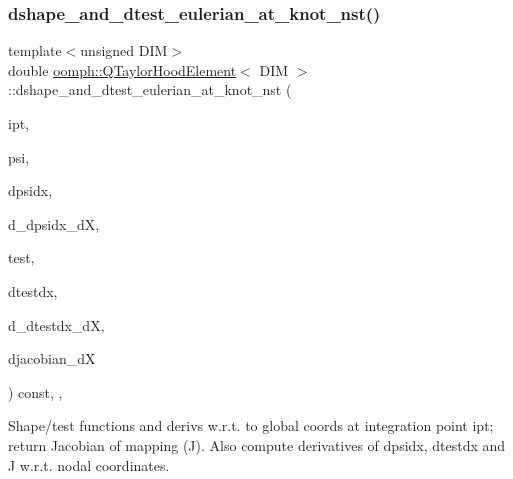 \mbox{\label{classoomph_1_1QTaylorHoodElement_ae37df57d30a5fdd716667e07ecd1796b}} 
\subsubsection{\texorpdfstring{dshape\+\_\+and\+\_\+dtest\+\_\+eulerian\+\_\+at\+\_\+knot\+\_\+nst()}{dshape\_and\_dtest\_eulerian\_at\_knot\_nst()}\hspace{0.1cm}{\footnotesize\ttfamily [2/4]}}
{\footnotesize\ttfamily template$<$unsigned D\+IM$>$ \\
double \hyperlink{classoomph_1_1QTaylorHoodElement}{oomph\+::\+Q\+Taylor\+Hood\+Element}$<$ D\+IM $>$\+::dshape\+\_\+and\+\_\+dtest\+\_\+eulerian\+\_\+at\+\_\+knot\+\_\+nst (\begin{DoxyParamCaption}\item[{const unsigned \&}]{ipt,  }\item[{\hyperlink{classoomph_1_1Shape}{Shape} \&}]{psi,  }\item[{\hyperlink{classoomph_1_1DShape}{D\+Shape} \&}]{dpsidx,  }\item[{\hyperlink{classoomph_1_1RankFourTensor}{Rank\+Four\+Tensor}$<$ double $>$ \&}]{d\+\_\+dpsidx\+\_\+dX,  }\item[{\hyperlink{classoomph_1_1Shape}{Shape} \&}]{test,  }\item[{\hyperlink{classoomph_1_1DShape}{D\+Shape} \&}]{dtestdx,  }\item[{\hyperlink{classoomph_1_1RankFourTensor}{Rank\+Four\+Tensor}$<$ double $>$ \&}]{d\+\_\+dtestdx\+\_\+dX,  }\item[{\hyperlink{classoomph_1_1DenseMatrix}{Dense\+Matrix}$<$ double $>$ \&}]{djacobian\+\_\+dX }\end{DoxyParamCaption}) const\hspace{0.3cm}{\ttfamily [inline]}, {\ttfamily [protected]}, {\ttfamily [virtual]}}



Shape/test functions and derivs w.\+r.\+t. to global coords at integration point ipt; return Jacobian of mapping (J). Also compute derivatives of dpsidx, dtestdx and J w.\+r.\+t. nodal coordinates. 



